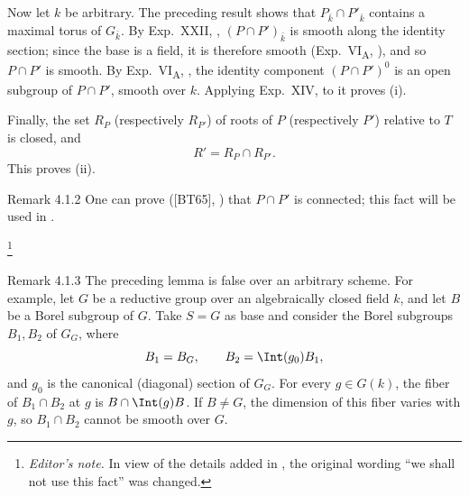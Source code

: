 Now let \(k\) be arbitrary.  The preceding result shows that
\(P_{\bar k}\cap P'_{\bar k}\) contains a maximal torus of
\(G_{\bar k}\).  By Exp.\ XXII, ,
\((P\cap P')_{\bar k}\) is smooth along the identity section; since the
base is a field, it is therefore smooth (Exp.\ VI\textsubscript{A},
), and so \(P\cap P'\) is smooth.  By Exp.\ VI\textsubscript{A},
, the identity component \((P\cap P')^0\) is an open subgroup of
\(P\cap P'\), smooth over \(k\).  Applying Exp.\ XIV,  to it proves
\textup{(i)}.

Finally, the set \(R_P\) (respectively \(R_{P'}\)) of roots of \(P\)
(respectively \(P'\)) relative to \(T\) is closed, and
\[
 R'=R_P\cap R_{P'}.
\]
This proves \textup{(ii)}.
\SGAQED

\begin{sgastatement}{Remark 4.1.2}
One can prove \textup{([BT65], )} that \(P\cap P'\) is connected; this
fact will be used in .
\end{sgastatement}
\footnote{\emph{Editor's note.} In view of the details added in ,
the original wording ``we shall not use this fact'' was changed.}

\begin{sgastatement}{Remark 4.1.3}
The preceding lemma is false over an arbitrary scheme.  For example, let
\(G\) be a reductive group over an algebraically closed field \(k\), and
let \(B\) be a Borel subgroup of \(G\).  Take \(S=G\) as base and
consider the Borel subgroups \(B_1,B_2\) of \(G_G\), where
\[
 B_1=B_G,\qquad B_2=\Int(g_0)B_1,
\]
and \(g_0\) is the canonical (diagonal) section of \(G_G\).  For every
\(g\in G(k)\), the fiber of \(B_1\cap B_2\) at \(g\) is
\(B\cap\Int(g)B\).  If \(B\ne G\), the dimension of this fiber varies
with \(g\), so \(B_1\cap B_2\) cannot be smooth over \(G\).
\end{sgastatement}


